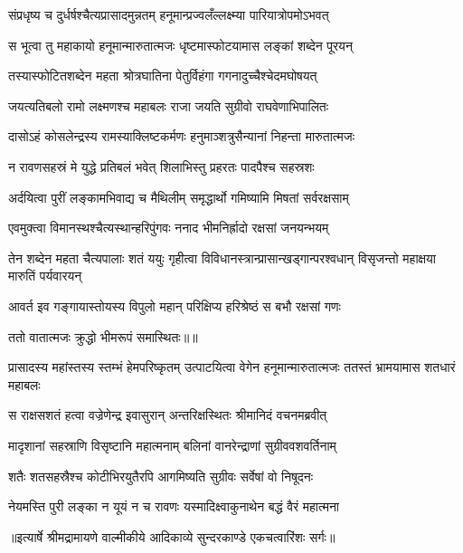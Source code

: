 \twolineshloka
{संप्रधृष्य च दुर्धर्षश्चैत्यप्रासादमुन्नतम्}
{हनूमान्प्रज्वलँल्लक्ष्म्या पारियात्रोपमोऽभवत्} %

\twolineshloka
{स भूत्वा तु महाकायो हनूमान्मारुतात्मजः}
{धृष्टमास्फोटयामास लङ्कां शब्देन पूरयन्} %

\twolineshloka
{तस्यास्फोटितशब्देन महता श्रोत्रघातिना}
{पेतुर्विहंगा गगनादुच्चैश्चेदमघोषयत्} %

\twolineshloka
{जयत्यतिबलो रामो लक्ष्मणश्च महाबलः}
{राजा जयति सुग्रीवो राघवेणाभिपालितः} %

\twolineshloka
{दासोऽहं कोसलेन्द्रस्य रामस्याक्लिष्टकर्मणः}
{हनुमाञ्शत्रुसैन्यानां निहन्ता मारुतात्मजः} %

\twolineshloka
{न रावणसहस्रं मे युद्धे प्रतिबलं भवेत्}
{शिलाभिस्तु प्रहरतः पादपैश्च सहस्रशः} %

\twolineshloka
{अर्दयित्वा पुरीं लङ्कामभिवाद्य च मैथिलीम्}
{समृद्धार्थो गमिष्यामि मिषतां सर्वरक्षसाम्} %

\twolineshloka
{एवमुक्त्वा विमानस्थश्चैत्यस्थान्हरिपुंगवः}
{ननाद भीमनिर्ह्रादो रक्षसां जनयन्भयम्} %

\threelineshloka
{तेन शब्देन महता चैत्यपालाः शतं ययुः}
{गृहीत्वा विविधानस्त्रान्प्रासान्खड्गान्परश्वधान्}
{विसृजन्तो महाक्षया मारुतिं पर्यवारयन्} %

\twolineshloka
{आवर्त इव गङ्गायास्तोयस्य विपुलो महान्}
{परिक्षिप्य हरिश्रेष्ठं स बभौ रक्षसां गणः} %

{ततो वातात्मजः क्रुद्धो भीमरूपं समास्थितः॥॥} %

\addtocounter{shlokacount}{1}

\threelineshloka
{प्रासादस्य महांस्तस्य स्तम्भं हेमपरिष्कृतम्}
{उत्पाटयित्वा वेगेन हनूमान्मारुतात्मजः}
{ततस्तं भ्रामयामास शतधारं महाबलः} %

\twolineshloka
{स राक्षसशतं हत्वा वज्रेणेन्द्र इवासुरान्}
{अन्तरिक्षस्थितः श्रीमानिदं वचनमब्रवीत्} %

\twolineshloka
{मादृशानां सहस्राणि विसृष्टानि महात्मनाम्}
{बलिनां वानरेन्द्राणां सुग्रीववशवर्तिनाम्} %

\twolineshloka
{शतैः शतसहस्रैश्च कोटीभिरयुतैरपि}
{आगमिष्यति सुग्रीवः सर्वेषां वो निषूदनः} %

\twolineshloka
{नेयमस्ति पुरी लङ्का न यूयं न च रावणः}
{यस्मादिक्ष्वाकुनाथेन बद्धं वैरं महात्मना} %


{॥इत्यार्षे श्रीमद्रामायणे वाल्मीकीये आदिकाव्ये सुन्दरकाण्डे एकचत्वारिंशः सर्गः॥}

